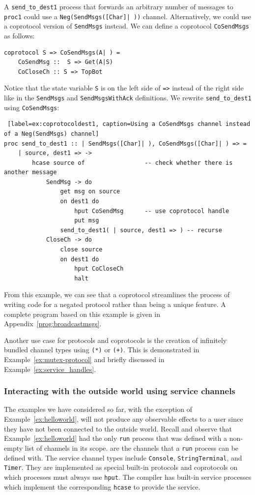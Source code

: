 \documentclass[11pt]{article}
\begin{document}
A \lstinline$send_to_dest1$ process that forwards an arbitrary number of messages to \lstinline$proc1$ could use a \lstinline$Neg(SendMsgs([Char]| ))$ channel.
Alternatively, we could use a coprotocol version of \lstinline$SendMsgs$ instead.
We can define a coprotocol \lstinline$CoSendMsgs$ as follows:
 \begin{lstlisting}[label=ex:coprotocolcopassmsgs, caption=Coprotocol for sending an arbitrary number of messages]
coprotocol S => CoSendMsgs(A| ) =
	CoSendMsg ::  S => Get(A|S)
	CoCloseCh :: S => TopBot
\end{lstlisting}
Notice that the state variable \lstinline$S$ is on the left side of \lstinline$=>$ instead of the right side like in the \lstinline$SendMsgs$ and \lstinline$SendMsgsWithAck$ definitions.
We rewrite \lstinline$send_to_dest1$ using \lstinline$CoSendMsgs$:
\begin{lstlisting} [label=ex:coprotocoldest1, caption=Using a CoSendMsgs channel instead of a Neg(SendMsgs) channel] 
proc send_to_dest1 :: | SendMsgs([Char]| ), CoSendMsgs([Char]| ) => =
	| source, dest1 => -> 
		hcase source of					-- check whether there is another message
			SendMsg -> do
				get msg on source 		
				on dest1 do
					hput CoSendMsg		-- use coprotocol handle
					put msg
				send_to_dest1( | source, dest1 => ) -- recurse
			CloseCh -> do
				close source
				on dest1 do
					hput CoCloseCh
					halt
 \end{lstlisting}
From this example, we can see that a coprotocol streamlines the process of writing code for a negated protocol rather than being a unique feature. 
A complete program based on this example is given in Appendix~\ref{prog:broadcastmsgs}.

Another use case for protocols and coprotocols is the creation of infinitely bundled channel types using \lstinline{(*)} or \lstinline{(+)}.
This is demonstrated in Example~\ref{ex:mutex-protocol} and briefly discussed in Example~\ref{ex:service_handles}.


\subsubsection{Interacting with the outside world using service channels}
\label{Sec:ServiceChannels}

The examples we have considered so far, with the exception of Example~\ref{ex:helloworld}, will not produce any observable effects to a user since they have not been connected to the outside world.
Recall and observe that Example~\ref{ex:helloworld} had the only \lstinline$run$ process that was defined with a non-empty list of channels in its scope.
 are the channels that a \lstinline$run$ process can be defined with. The service channel types include \lstinline$Console$, \lstinline$StringTerminal$, and \lstinline$Timer$. 
They are implemented as special built-in protocols and coprotocols on which processes must always use \lstinline$hput$.
The compiler has built-in service processes which implement the corresponding \lstinline$hcase$ to provide the service.
\end{document}
